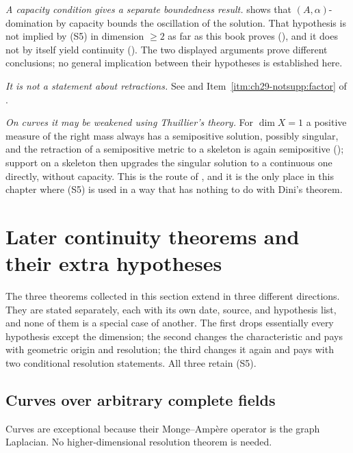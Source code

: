 \emph{A capacity condition gives a separate boundedness result.}
 shows that
$(A,\alpha)$-domination by capacity bounds the oscillation of the
solution.  That hypothesis is not implied by \textup{(S5)} in dimension
$\geq2$ as far as this book proves
(), and it does not by itself yield continuity
().  The two displayed arguments prove different conclusions; no
general implication between their hypotheses is established here.

\emph{It is not a statement about retractions.}  See
 and
Item~\cref{itm:ch29-notsupp:factor} of .

\emph{On curves it may be weakened using Thuillier's theory.}  For
$\dim X=1$ a positive measure of the right mass always has a semipositive
solution, possibly singular, and the retraction of a semipositive metric to
a skeleton is again semipositive
(); support on a skeleton then upgrades
the singular solution to a continuous one directly, without capacity.  This
is the route of , and it is the
only place in this chapter where \textup{(S5)} is used in a way that has
nothing to do with Dini's theorem.

\section{Later continuity theorems and their extra hypotheses}
\label{sec:ch29-later}

The three theorems collected in this section extend
 in three different directions.
They are stated separately, each with its own date, source, and hypothesis
list, and none of them is a special case of another.  The first drops
essentially every hypothesis except the dimension; the second changes the
characteristic and pays with geometric origin and resolution; the third
changes it again and pays with two conditional resolution statements.  All
three retain \textup{(S5)}.

\subsection{Curves over arbitrary complete fields}
\label{sec:ch29-later-curves}

Curves are exceptional because their Monge--Amp\`ere operator is the graph
Laplacian.  No higher-dimensional resolution theorem is needed.

